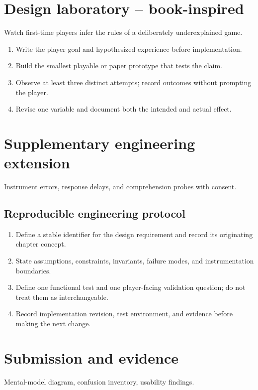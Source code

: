 \documentclass[11pt]{article}
\begin{document}
\section{Design laboratory -- book-inspired}
Watch first-time players infer the rules of a deliberately underexplained game.

\begin{enumerate}
\item Write the player goal and hypothesized experience before implementation.
\item Build the smallest playable or paper prototype that tests the claim.
\item Observe at least three distinct attempts; record outcomes without prompting the player.
\item Revise one variable and document both the intended and actual effect.
\end{enumerate}

\section{Supplementary engineering extension}
Instrument errors, response delays, and comprehension probes with consent.


\subsection{Reproducible engineering protocol}
\begin{enumerate}
\item Define a stable identifier for the design requirement and record its originating chapter concept.
\item State assumptions, constraints, invariants, failure modes, and instrumentation boundaries.
\item Define one functional test and one player-facing validation question; do not treat them as interchangeable.
\item Record implementation revision, test environment, and evidence before making the next change.
\end{enumerate}

\section{Submission and evidence}
Mental-model diagram, confusion inventory, usability findings.
\end{document}
